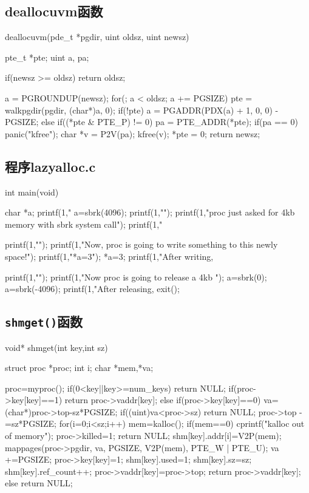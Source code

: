 \documentclass{swfcthesismscctex}
\begin{document}
\subsection{deallocuvm函数}
\label{sec:deallocuvm}

\begin{ccode}
deallocuvm(pde_t *pgdir, uint oldsz, uint newsz)
{
  pte_t *pte;
  uint a, pa;

  if(newsz >= oldsz)
    return oldsz;

  a = PGROUNDUP(newsz);
  for(; a  < oldsz; a += PGSIZE){
    pte = walkpgdir(pgdir, (char*)a, 0);
    if(!pte)
      a = PGADDR(PDX(a) + 1, 0, 0) - PGSIZE;
    else if((*pte & PTE_P) != 0){
      pa = PTE_ADDR(*pte);
      if(pa == 0)
        panic("kfree");
      char *v = P2V(pa);
      kfree(v);
      *pte = 0;
    }
  }
  return newsz;
}
\end{ccode}

\subsection{程序lazyalloc.c}
\label{sec:lazyalloc}

\begin{ccode}
int main(void)
{
  char *a;
  printf(1,"%
  a=sbrk(4096);
  printf(1,"\n");
  printf(1,"proc just asked for 4kb memory with sbrk system call\n\n");
  printf(1,"%

  printf(1,"\n");
  printf(1,"Now, proc is going to write something to this newly space!\n");
  printf(1,"*a=3\n");
  *a=3;
  printf(1,"After writing, %

  printf(1,"\n");
  printf(1,"Now proc is going to release a 4kb \n\n");
  a=sbrk(0);
  a=sbrk(-4096);
  printf(1,"After releasing, %
  exit();
}
\end{ccode}

\subsection{\texttt{shmget()}函数}
\label{sec:shmget}
\begin{ccode}
void* shmget(int key,int sz)
{
  struct proc *proc;
  int i;
  char *mem,*va;
  
  proc=myproc();
  if(0<key||key>=num_keys)
    return NULL;
  if(proc->key[key]==1)
  {
    return proc->vaddr[key];
  }
  else if(proc->key[key]==0)
  {
    va=(char*)proc->top-sz*PGSIZE;
    if((uint)va<proc->sz)
      return NULL;
    proc->top -=sz*PGSIZE;
    for(i=0;i<sz;i++){
      mem=kalloc();
      if(mem==0)
      {
        cprintf("kalloc out of memory\n");
        proc->killed=1;
        return NULL;
      }
      shm[key].addr[i]=V2P(mem);
    mappages(proc->pgdir, va, PGSIZE, V2P(mem), PTE_W | PTE_U);
    va +=PGSIZE;
    }
    proc->key[key]=1;
    shm[key].used=1;
    shm[key].sz=sz;
    shm[key].ref_count++;
    proc->vaddr[key]=proc->top;
    return proc->vaddr[key];
  }
  else
    return NULL;
}
\end{ccode}
\end{document}
